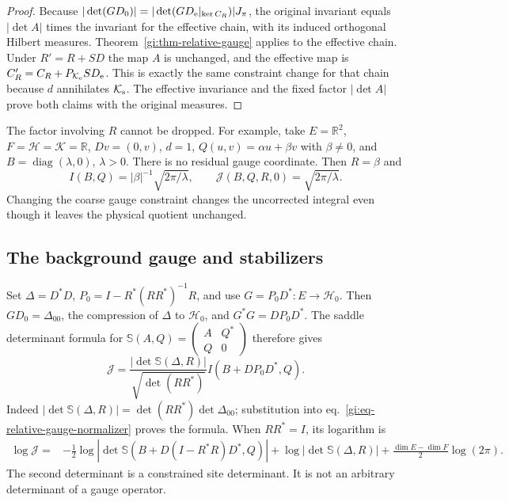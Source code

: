 \documentclass[11pt,letterpaper,reqno]{amsart}
\numberwithin{equation}{section}
\renewcommand{\eqref}[1]{\textup{eq.~\ref{#1}}}
\theoremstyle{definition}
\theoremstyle{remark}
\begin{document}
\begin{proof}
Because \(|\det(GD_0)|=|\det(GD_{\rm e}|_{\ker C_R})|J_\pi\),
the original invariant equals \(|\det A|\) times
the invariant for the effective chain, with its induced
orthogonal Hilbert measures. Theorem~\ref{gi:thm-relative-gauge}
applies to the effective chain. Under \(R'=R+SD\) the map
\(A\) is unchanged, and the effective map is
\(C_R'=C_R+P_{\mathcal K_{\rm e}}SD_{\rm e}\).
This is exactly the same constraint change for that chain
because \(d\) annihilates \(\mathcal K_{\rm s}\).
The effective invariance and the fixed factor \(|\det A|\)
prove both claims with the original measures.
\end{proof}

The factor involving $R$ cannot be dropped. For example, take
$E=\mathbb R^2$, $F=\mathcal H=\mathcal K=\mathbb R$,
$Dv=(0,v)$, $d=1$, $Q(u,v)=\alpha u+\beta v$ with
$\beta\ne0$, and $B=\operatorname{diag}(\lambda,0)$,
$\lambda>0$. There is no residual gauge coordinate.
Then $R=\beta$ and
\[
 I(B,Q)=|\beta|^{-1}\sqrt{2\pi/\lambda},\qquad
 \mathcal J(B,Q,R,0)=\sqrt{2\pi/\lambda}.
\]
Changing the coarse gauge constraint changes the uncorrected
integral even though it leaves the physical quotient unchanged.

\subsection{The background gauge and stabilizers}

Set $\Delta=D^*D$, $P_0=I-R^*(RR^*)^{-1}R$, and use
$G=P_0D^*:E\to\mathcal H_0$. Then
$GD_0=\Delta_{00}$, the compression of $\Delta$ to
$\mathcal H_0$, and $G^*G=DP_0D^*$. The saddle determinant
formula for $\mathbb S(A,Q)=\left(\begin{smallmatrix}A&Q^*\\Q&0\end{smallmatrix}\right)$
therefore gives
\begin{equation}\label{gi:eq-background-gauge-normalizer}
 \mathcal J=
 \frac{|\det\mathbb S(\Delta,R)|}{\sqrt{\det(RR^*)}}
                    I(B+DP_0D^*,Q).
\end{equation}
Indeed $|\det\mathbb S(\Delta,R)|=
\det(RR^*)\det\Delta_{00}$; substitution into
\eqref{gi:eq-relative-gauge-normalizer} proves the formula.
When $RR^*=I$, its logarithm is
\begin{align}
 \log\mathcal J={}&
  -\tfrac12\log|\det\mathbb S(B+D(I-R^*R)D^*,Q)|
  +\log|\det\mathbb S(\Delta,R)|
  +\tfrac{\dim E-\dim F}{2}\log(2\pi).
 \label{gi:eq-background-gauge-log}
\end{align}
The second determinant is a constrained site determinant.
It is not an arbitrary determinant of a gauge operator.
\end{document}
